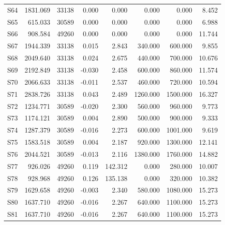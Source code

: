 \begin{longtable}{lrrrrrrr}
S64 & 1831.069 & 33138 & 0.000 & 0.000 & 0.000 & 0.000 & 8.452\\
S65 & 615.033 & 30589 & 0.000 & 0.000 & 0.000 & 0.000 & 6.988\\
S66 & 908.584 & 49260 & 0.000 & 0.000 & 0.000 & 0.000 & 11.744\\
S67 & 1944.339 & 33138 & 0.015 & 2.843 & 340.000 & 600.000 & 9.855\\
S68 & 2049.640 & 33138 & 0.024 & 2.675 & 440.000 & 700.000 & 10.676\\
S69 & 2192.849 & 33138 & -0.030 & 2.458 & 600.000 & 860.000 & 11.574\\
S70 & 2066.633 & 33138 & -0.011 & 2.537 & 460.000 & 720.000 & 10.594\\
S71 & 2838.726 & 33138 & 0.043 & 2.489 & 1260.000 & 1500.000 & 16.327\\
S72 & 1234.771 & 30589 & -0.020 & 2.300 & 560.000 & 960.000 & 9.773\\
S73 & 1174.121 & 30589 & 0.004 & 2.890 & 500.000 & 900.000 & 9.333\\
S74 & 1287.379 & 30589 & -0.016 & 2.273 & 600.000 & 1001.000 & 9.619\\
S75 & 1583.518 & 30589 & 0.004 & 2.187 & 920.000 & 1300.000 & 12.141\\
S76 & 2044.521 & 30589 & -0.013 & 2.116 & 1380.000 & 1760.000 & 14.882\\
S77 & 926.026 & 49260 & 0.119 & 142.312 & 0.000 & 280.000 & 10.007\\
S78 & 928.968 & 49260 & 0.126 & 135.138 & 0.000 & 320.000 & 10.382\\
S79 & 1629.658 & 49260 & -0.003 & 2.340 & 580.000 & 1080.000 & 15.273\\
S80 & 1637.710 & 49260 & -0.016 & 2.267 & 640.000 & 1100.000 & 15.273\\
S81 & 1637.710 & 49260 & -0.016 & 2.267 & 640.000 & 1100.000 & 15.273\\
\end{longtable}\endgroup
